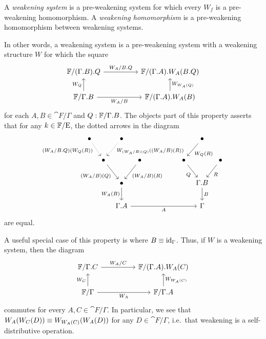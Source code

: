 \begin{defn}
A \emph{weakening system} is a pre-weakening system for which every $W_f$ is a
pre-weakening homomorphism. A \emph{weakening homomorphism} is a pre-weakening 
homomorphism between weakening systems.
\end{defn}

\begin{rmk}
In other words, a weakening system is a pre-weakening system with a weakening
structure $W$ for which the square
\begin{equation*}
\begin{tikzcd}[column sep=huge]
\cat{F}/\ctxext{{\Gamma}{B}}{Q}
  \arrow[r,"W_A/\ctxext{B}{Q}"]
  &
\cat{F}/\ctxext{{\Gamma}{A}}{W_A(\ctxext{B}{Q})}
  \\
\cat{F}/\ctxext{\Gamma}{B}
  \arrow[u,"W_Q"]
  \arrow[r,swap,"W_A/B"]
  &
\cat{F}/\ctxext{{\Gamma}{A}}{W_A(B)}
  \arrow[u,swap,"W_{W_A(Q)}"]
\end{tikzcd}
\end{equation*}
for each $A,B\in\cat{F}/\Gamma$ and $Q:\cat{F}/\ctxext{\Gamma}{B}$. The objects part of this 
property asserts that for any $k\in \mathbb{F}/\mathrm{E}$, the dotted arrows in the diagram
\begin{equation*}
\begin{tikzcd}[column sep=tiny]
\bullet \arrow[dr,densely dotted,swap,near start,"(W_A/\ctxext{B}{Q})(W_Q(R))"] & & \bullet \arrow[dl,densely dotted,near start,"W_{(W_A/B)(Q)}((W_A/B)(R))"] & & & & & & & & & & \bullet \arrow[dl,"W_Q(R)"] \\
& \bullet \arrow[dr,swap,"(W_A/B)(Q)"] & & \bullet \arrow[dl,"(W_A/B)(R)"] & & & & & & & & \bullet \arrow[dr,swap,"Q"] & & \bullet \arrow[dl,"R"] \\
& & \bullet \arrow[d,swap,"W_A(B)"] & & & & & & & & & & \ctxext{\Gamma}{B} \arrow[d,"B"] \\
& & \ctxext{\Gamma}{A} \arrow[rrrrrrrrrr,swap,"A"] & & & & & & & & & & \Gamma
\end{tikzcd}
\end{equation*}
are equal.

A useful special case of this property is where $B\equiv {\mathrm{id}_{\Gamma}}$. Thus, if $W$ is
a weakening system, then the diagram
\begin{equation*}
\begin{tikzcd}[column sep=huge]
\cat{F}/\ctxext{\Gamma}{C}
  \arrow[r,"W_A/C"]
  &
\cat{F}/\ctxext{{\Gamma}{A}}{W_A(C)}
  \\
\cat{F}/\Gamma
  \arrow[u,"W_C"]
  \arrow[r,swap,"W_A"]
  &
\cat{F}/\ctxext{\Gamma}{A}
  \arrow[u,swap,"W_{W_A(C)}"]
\end{tikzcd}
\end{equation*}
commutes for every $A,C\in\cat{F}/\Gamma$. In particular, we see
that $W_A(W_C(D))\equiv W_{W_A(C)}(W_A(D))$ for any $D\in\cat{F}/\Gamma$,
i.e.~that weakening is a self-distributive operation. 
\end{rmk}

